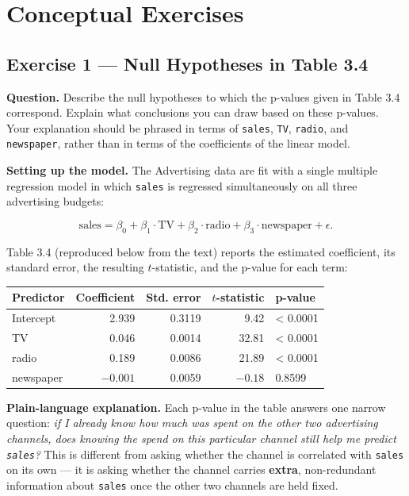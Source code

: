 \documentclass[
  11pt,
]{article}
\author{}
\date{\vspace{-2.5em}}
\newcounter{none} %
\begin{document}

\tableofcontents
\newpage

\section{Conceptual Exercises}\label{conceptual-exercises}

\subsection{Exercise 1 --- Null Hypotheses in Table
3.4}\label{exercise-1-null-hypotheses-in-table-3.4}

\textbf{Question.} Describe the null hypotheses to which the p-values
given in Table 3.4 correspond. Explain what conclusions you can draw
based on these p-values. Your explanation should be phrased in terms of
\texttt{sales}, \texttt{TV}, \texttt{radio}, and \texttt{newspaper},
rather than in terms of the coefficients of the linear model.

\textbf{Setting up the model.} The Advertising data are fit with a
single multiple regression model in which \texttt{sales} is regressed
simultaneously on all three advertising budgets:

\[
\text{sales} = \beta_0 + \beta_1 \cdot \text{TV} + \beta_2 \cdot \text{radio} + \beta_3 \cdot \text{newspaper} + \epsilon .
\]

Table 3.4 (reproduced below from the text) reports the estimated
coefficient, its standard error, the resulting \(t\)-statistic, and the
p-value for each term:

{\def\LTcaptype{none} %
\begin{longtable}[]{@{}lrrrl@{}}
\toprule\noalign{}
Predictor & Coefficient & Std. error & \(t\)-statistic & p-value \\
\midrule\noalign{}
\endhead
\bottomrule\noalign{}
\endlastfoot
Intercept & 2.939 & 0.3119 & 9.42 & \textless{} 0.0001 \\
TV & 0.046 & 0.0014 & 32.81 & \textless{} 0.0001 \\
radio & 0.189 & 0.0086 & 21.89 & \textless{} 0.0001 \\
newspaper & \(-0.001\) & 0.0059 & \(-0.18\) & 0.8599 \\
\end{longtable}
}

\textbf{Plain-language explanation.} Each p-value in the table answers
one narrow question: \emph{if I already know how much was spent on the
other two advertising channels, does knowing the spend on this
particular channel still help me predict \texttt{sales}?} This is
different from asking whether the channel is correlated with
\texttt{sales} on its own --- it is asking whether the channel carries
\textbf{extra}, non-redundant information about \texttt{sales} once the
other two channels are held fixed.
\end{document}
